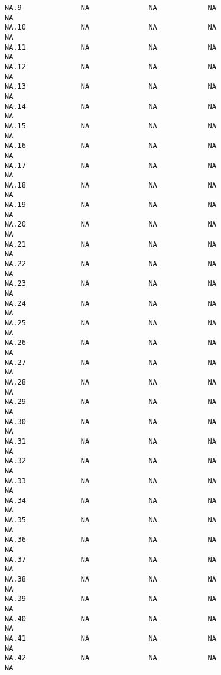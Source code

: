 \documentclass[
  letterpaper,
  DIV=11,
  numbers=noendperiod]{scrartcl}
\begin{document}
\begin{verbatim}
NA.9              NA              NA            NA                        NA
NA.10             NA              NA            NA                        NA
NA.11             NA              NA            NA                        NA
NA.12             NA              NA            NA                        NA
NA.13             NA              NA            NA                        NA
NA.14             NA              NA            NA                        NA
NA.15             NA              NA            NA                        NA
NA.16             NA              NA            NA                        NA
NA.17             NA              NA            NA                        NA
NA.18             NA              NA            NA                        NA
NA.19             NA              NA            NA                        NA
NA.20             NA              NA            NA                        NA
NA.21             NA              NA            NA                        NA
NA.22             NA              NA            NA                        NA
NA.23             NA              NA            NA                        NA
NA.24             NA              NA            NA                        NA
NA.25             NA              NA            NA                        NA
NA.26             NA              NA            NA                        NA
NA.27             NA              NA            NA                        NA
NA.28             NA              NA            NA                        NA
NA.29             NA              NA            NA                        NA
NA.30             NA              NA            NA                        NA
NA.31             NA              NA            NA                        NA
NA.32             NA              NA            NA                        NA
NA.33             NA              NA            NA                        NA
NA.34             NA              NA            NA                        NA
NA.35             NA              NA            NA                        NA
NA.36             NA              NA            NA                        NA
NA.37             NA              NA            NA                        NA
NA.38             NA              NA            NA                        NA
NA.39             NA              NA            NA                        NA
NA.40             NA              NA            NA                        NA
NA.41             NA              NA            NA                        NA
NA.42             NA              NA            NA                        NA

\end{verbatim}
\end{document}

